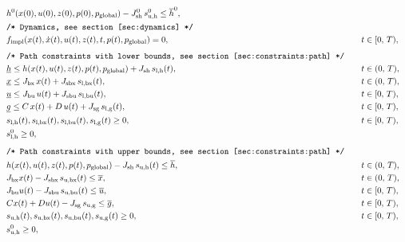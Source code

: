 \documentclass[english]{article}
\newcommand{\ind}[1]{_{\textrm{#1}}}
\newcommand{\initial}{^{\textrm{0}}}
\newcommand{\glob}{_{\textrm{global}}}
\newcommand{\lowerh}{\ind{l,h}}
\newcommand{\lowerbx}{\ind{l,bx}}
\newcommand{\lowerbu}{\ind{l,bu}}
\newcommand{\lowerg}{\ind{l,g}}
\newcommand{\upperh}{\ind{u,h}}
\newcommand{\upperbx}{\ind{u,bx}}
\newcommand{\upperbu}{\ind{u,bu}}
\newcommand{\upperg}{\ind{u,g}}
\newcommand{\mathComment}[1]{\texttt{/* #1 */}}
\begin{document}
\begin{align}
    &&& h\initial(x(0), u(0),  z(0), p(0), p\glob) - J\ind{sh}\initial\, s\ind{u,h}\initial \leq \overline{h}\initial, &&\label{eq:constraints:path:upper_bounds:start}\\
    &&&\mathComment{Dynamics, see section \ref{sec:dynamics}}\nonumber\\
    &&& f\ind{impl}(x(t), \dot{x}(t), u(t), z(t), t, p(t), p\glob) = 0, &&\quad t \in [0,\,T), \label{eq:dynamics}\\[1ex]
    &&&\mathComment{Path constraints with lower bounds, see section \ref{sec:constraints:path}}\nonumber\\
    &&&\underline{h} \leq h(x(t), u(t), z(t), p(t), p\glob) + J_{\textrm{sh}} \, s\lowerh(t), &&\quad t \in (0,\,T),\\
    &&&\underline{x} \leq J_{\textrm{bx}} \, x(t) + J_{\textrm{sbx}} \,s\lowerbx(t), &&\quad t \in (0,\,T),\\
    &&&\underline{u} \leq J_{\textrm{bu}} \,u(t) + J_{\textrm{sbu}} \,s\lowerbu(t), &&\quad t \in [0,\,T),\\
    &&&\underline{g} \leq C\,x(t) + D\,u(t) + J_{\textrm{sg}} \,s\lowerg(t), &&\quad t \in [0,\,T), \\
    &&& s\lowerh (t), s\lowerbx(t), s\lowerbu(t), s\lowerg(t) \geq 0, &&\quad t \in [0,\,T), \\
    &&& s\lowerh\initial \geq 0, && \label{eq:constraints:path:lower_bounds:end}\\[1ex]
    &&&\mathComment{Path constraints with upper bounds, see section \ref{sec:constraints:path}}\nonumber\\
    &&& h(x(t), u(t), z(t), p(t), p\glob) - J_{\textrm{sh}} \, s\upperh(t) \leq \overline{h}, &&\quad t \in (0,\,T),\\
    &&& J_{\textrm{bx}} x(t) - J_{\textrm{sbx}}\, s\upperbx(t) \leq \overline{x}, &&\quad t \in (0,\,T),\\
    &&& J_{\textrm{bu}} u(t) - J_{\textrm{sbu}}\, s\upperbu(t)\leq \overline{u}, &&\quad t \in [0,\,T),\\
    &&& Cx(t) + Du(t) - J_{\textrm{sg}}\, s\upperg \leq \overline{g}, &&\quad t \in [0,\,T), \\
    &&& s\upperh(t), s\upperbx(t), s\upperbu(t), s\upperg(t) \geq 0, &&\quad t \in [0,\,T), \\
    &&& s\ind{u,h}\initial \geq 0, && \label{eq:constraints:path:upper_bounds:end}\\[1ex]

\end{align}
\end{document}
